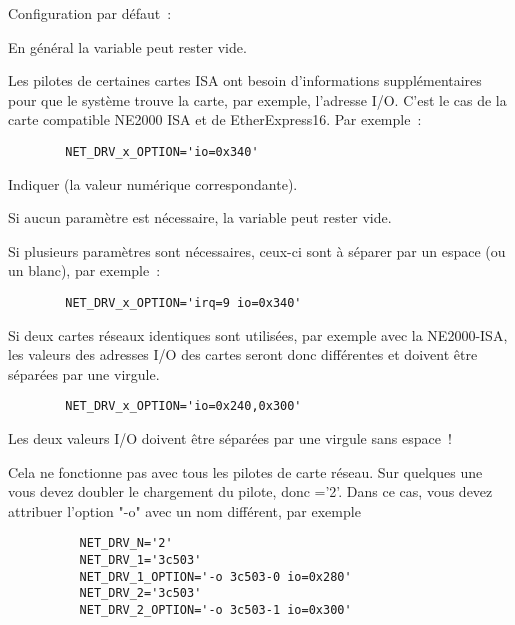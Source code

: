 \begin{description}
    Configuration par défaut~: 

    {En général la variable peut rester vide.

    Les pilotes de certaines cartes ISA ont besoin d'informations supplémentaires
    pour que le système trouve la carte, par exemple, l'adresse I/O. C'est
    le cas de la carte compatible NE2000 ISA et de EtherExpress16.
    Par exemple~:

\begin{example}
\begin{verbatim}
        NET_DRV_x_OPTION='io=0x340'
\end{verbatim}
\end{example}

    Indiquer (la valeur numérique correspondante).

    Si aucun paramètre est nécessaire, la variable peut rester vide.

    Si plusieurs paramètres sont nécessaires, ceux-ci sont à séparer par un espace
    (ou un blanc), par exemple~:
\begin{example}
\begin{verbatim}
        NET_DRV_x_OPTION='irq=9 io=0x340'
\end{verbatim}
\end{example}

    Si deux cartes réseaux identiques sont utilisées, par exemple avec la
    NE2000-ISA, les valeurs des adresses I/O des cartes seront donc différentes
    et doivent être séparées par une virgule.

\begin{example}
\begin{verbatim}
        NET_DRV_x_OPTION='io=0x240,0x300'
\end{verbatim}
\end{example}

    Les deux valeurs I/O doivent être séparées par une virgule sans espace~!

    Cela ne fonctionne pas avec tous les pilotes de carte réseau. Sur quelques
    une vous devez doubler le chargement du pilote, donc ='2'.
    Dans ce cas, vous devez attribuer l'option "-o" avec un nom différent,
    par exemple

    \begin{example}
    \begin{verbatim}
          NET_DRV_N='2'
          NET_DRV_1='3c503'
          NET_DRV_1_OPTION='-o 3c503-0 io=0x280'
          NET_DRV_2='3c503'
          NET_DRV_2_OPTION='-o 3c503-1 io=0x300'
    \end{verbatim}
    \end{example}

}
\end{description}

